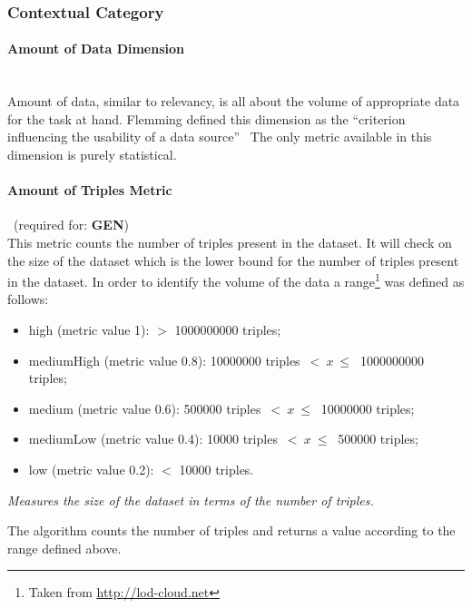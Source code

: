 \subsubsection{Contextual Category}
\label{sec:Contextual} 

\paragraph{Amount of Data Dimension}~\\ %
Amount of data, similar to relevancy, is all about the volume of appropriate data for the task at hand.
Flemming defined this dimension as the ``criterion influencing the usability of a data source''~\cite{Flemming2008}
The only metric available in this dimension is purely statistical.

\paragraph{Amount of Triples Metric}~(required for: \textbf{GEN})~\\ %
This metric counts the number of triples present in the dataset. 
It will check on the size of the dataset which is the lower bound for the number of triples present in the dataset.
In order to identify the volume of the data a range\footnote{Taken from \url{http://lod-cloud.net}} was defined as follows:
\begin{itemize}
\item high (metric value 1):  $>$ 1000000000 triples;
\item mediumHigh (metric value 0.8): 10000000 triples~$<~x~\leq~$ 1000000000 triples;
\item medium (metric value 0.6): 500000 triples~$<~x~\leq~$ 10000000 triples;
\item mediumLow (metric value 0.4): 10000 triples~$<~x~\leq~$ 500000 triples;
\item low (metric value 0.2): $<$ 10000 triples.
\end{itemize}

\begin{mdframed}[style=metricdefinition]
\emph{Measures the size of the dataset in terms of the number of triples.}
\end{mdframed}

The algorithm counts the number of triples and returns a value according to the range defined above.